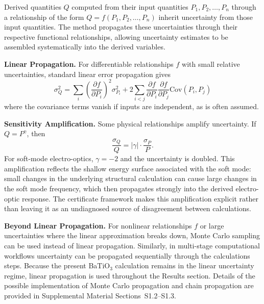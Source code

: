 \documentclass[prb,twocolumn,superscriptaddress,amsmath,amssymb,longbibliography]{revtex4-2}
\begin{document}
Derived quantities $Q$ computed from their input quantities $P_1, P_2, \ldots, P_n$ through a relationship of the form $Q = f(P_1, P_2, \ldots, P_n)$ inherit uncertainty from 
those input quantities. The method propagates these uncertainties through their respective functional relationships, allowing uncertainty estimates to be assembled systematically into the derived variables.

{\bf Linear Propagation.}
For differentiable relationships $f$ with small relative uncertainties, standard linear error 
propagation gives \cite{JCGM2008_GUM}
\begin{equation}
    \sigma_Q^2 = \sum_i \left(\frac{\partial f}{\partial P_i}\right)^2 \sigma_{P_i}^2
    + 2 \sum_{i<j} \frac{\partial f}{\partial P_i} \frac{\partial f}{\partial P_j} 
    \mathrm{Cov}(P_i, P_j)
    \label{eq:linear_prop}
\end{equation}
where the covariance terms vanish if inputs are independent, as is often assumed.

{\bf Sensitivity Amplification.}
Some physical relationships amplify uncertainty. If $Q = P^\gamma$, then 
\begin{equation}
\frac{\sigma_Q}{Q} = |\gamma| \cdot \frac{\sigma_P}{P}.
\end{equation} 
For soft-mode electro-optics, $\gamma = -2$ and the uncertainty is doubled. 
This amplification reflects the shallow energy surface associated with the soft mode: 
small changes in the underlying structural calculation can cause large changes in the soft
mode frequency, which then propagates strongly into the derived electro-optic
response. 
The certificate framework 
makes this amplification explicit rather than leaving it as 
an undiagnosed source of disagreement between calculations.

{\bf Beyond Linear Propagation.}
For nonlinear relationships $f$ or large uncertainties where the linear approximation 
breaks down, Monte Carlo sampling can be used instead of linear propagation. Similarly, in multi-stage computational workflows uncertainty can be propagated sequentially through the calculations steps. Because the present BaTiO$_3$ calculation remains in the linear uncertainty regime, linear propagation is used throughout the Results section. Details of the possible implementation of Monte Carlo propagation and chain propagation are provided in Supplemental Material Sections~S1.2--S1.3. 
\end{document}

